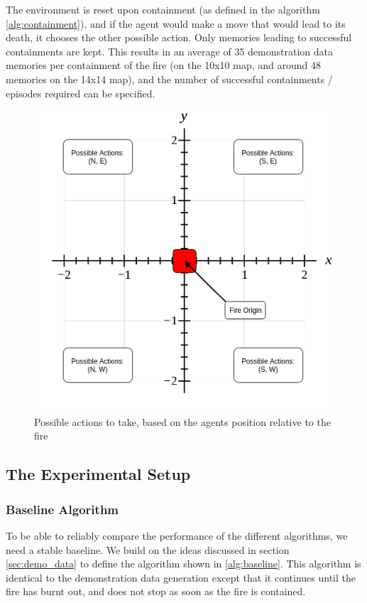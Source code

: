 The environment is reset upon containment (as defined in the algorithm \ref{alg:containment}), and if the agent would make a move that would lead to its death, it chooses the other possible action. Only memories leading to successful containments are kept. This results in an average of 35 demonstration data memories per containment of the fire (on the 10x10 map, and around 48 memories on the 14x14 map), and the number of successful containments / episodes required can be specified.

\begin{figure}[h]
    \centering
    \includegraphics[width=1\linewidth]{img/Demo-data_Baseline.png}
    \caption{Possible actions to take, based on the agents position relative to the fire}
    \label{fig:demodata}
\end{figure}



\subsection{The Experimental Setup}\label{sec:experiment}

\subsubsection{Baseline Algorithm}\label{sec:baseline}
To be able to reliably compare the performance of the different algorithms, we need a stable baseline. We build on the ideas discussed in section \ref{sec:demo_data} to define the algorithm shown in \ref{alg:baseline}. This algorithm is identical to the demonstration data generation except that it continues until the fire has burnt out, and does not stop as soon as the fire is contained.

